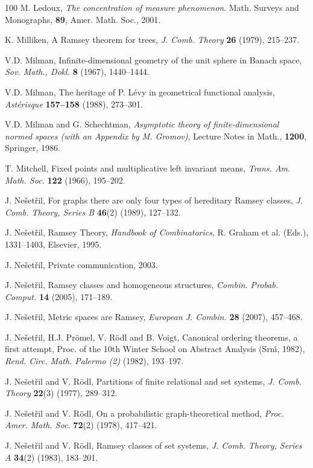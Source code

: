 \begin{thebibliography}{100}
M. Ledoux, {\it The concentration of measure phenomenon}. Math. Surveys and
Monographs, {\bf 89}, Amer. Math. Soc., 2001.

K. Milliken, A Ramsey theorem for trees, {\it J. Comb. Theory} {\bf 26} (1979),
215--237.

V.D. Milman, Infinite-dimensional geometry of the unit sphere in Banach space,
{\it Sov. Math., Dokl.} {\bf 8} (1967), 1440--1444.

V.D. Milman, The heritage of P. L\'{e}vy in geometrical functional analysis,
{\it Ast\'{e}risque} {\bf 157--158} (1988), 273--301.

V.D. Milman and G. Schechtman, {\it Asymptotic theory of finite-dimensional
normed spaces (with an Appendix by M. Gromov)},
Lecture Notes in Math., {\bf 1200}, Springer, 1986.

 T. Mitchell,
Fixed points and multiplicative left invariant means,
{\it Trans. Am. Math. Soc.} {\bf 122} (1966), 195--202.

J. Ne\v{s}et\v{r}il, For graphs there are only four types of
hereditary Ramsey classes, {\it J. Comb. Theory, Series B} {\bf 46}(2)
(1989), 127--132.

J. Ne\v{s}et\v{r}il, Ramsey Theory, {\it Handbook of Combinatorics},
R. Graham et al. (Eds.), 1331--1403, Elsevier, 1995.

J. Ne\v{s}et\v{r}il, Private communication, 2003.

J. Ne\v{s}et\v{r}il, Ramsey classes and homogeneous structures,
{\it Combin. Probab. Comput.} {\bf 14} (2005), 171--189.

J. Ne\v{s}et\v{r}il, Metric spaces are Ramsey,
{\it European J. Combin.} {\bf 28} (2007), 457--468.

J. Ne\v{s}et\v{r}il, H.J. Pr\"omel, V. R\"odl and B. Voigt, Canonical
ordering theorems, a first attempt, Proc. of the 10th Winter School on
Abstract Analysis (Srn\'\i, 1982), {\it Rend. Circ. Math. Palermo (2)} (1982),
193--197.

J. Ne\v{s}et\v{r}il and V. R\"odl, Partitions of finite relational and
set systems, {\it J. Comb. Theory} {\bf 22}(3) (1977), 289--312.

J. Ne\v{s}et\v{r}il and V. R\"odl, On a probabilistic graph-theoretical
method, {\it Proc. Amer. Math. Soc.} {\bf 72}(2) (1978), 417--421.

J. Ne\v{s}et\v{r}il and V. R\"odl, Ramsey classes of set systems,
{\it J. Comb. Theory, Series A} {\bf 34}(2) (1983), 183--201.


\end{thebibliography}
